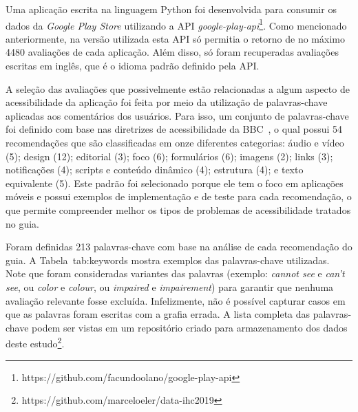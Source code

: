 Uma aplicação escrita na linguagem Python foi desenvolvida para consumir os dados da \textit{Google Play Store} utilizando a API \emph{google-play-api}\footnote{https://github.com/facundoolano/google-play-api}. Como mencionado anteriormente, na versão utilizada esta API só permitia o retorno de no máximo 4480 avaliações de cada aplicação. Além disso, só foram recuperadas avaliações escritas em inglês, que é o idioma padrão definido pela API.


A seleção das avaliações que possivelmente estão relacionadas a algum aspecto de acessibilidade da aplicação foi feita por meio da utilização de palavras-chave aplicadas aos comentários dos usuários.
Para isso, um conjunto de palavras-chave foi definido com base nas diretrizes de acessibilidade da BBC~\cite{bbc}, o qual possui 54 recomendações que são classificadas em onze diferentes categorias: áudio e vídeo (5); design (12); editorial (3); foco (6); formulários (6); imagens (2); links (3); notificações (4); scripts e conteúdo dinâmico (4); estrutura (4); e texto equivalente (5). 
Este padrão foi selecionado porque ele tem o foco em aplicações móveis e possui exemplos de implementação e de teste para cada recomendação, o que permite compreender melhor os tipos de problemas de acessibilidade tratados no guia. 

Foram definidas 213 palavras-chave com base na análise de cada recomendação do guia. 
A Tabela~{tab:keywords} mostra exemplos das palavras-chave utilizadas.
Note que foram consideradas variantes das palavras (exemplo: \textit{cannot see} e \textit{can't see}, ou \textit{color} e \textit{colour}, ou \textit{impaired} e \textit{impairement}) para garantir que nenhuma avaliação relevante fosse excluída. Infelizmente, não é possível capturar casos em que as palavras foram escritas com a grafia errada. A lista completa das palavras-chave podem ser vistas em um repositório criado para armazenamento dos dados deste estudo\footnote{https://github.com/marceloeler/data-ihc2019}.


